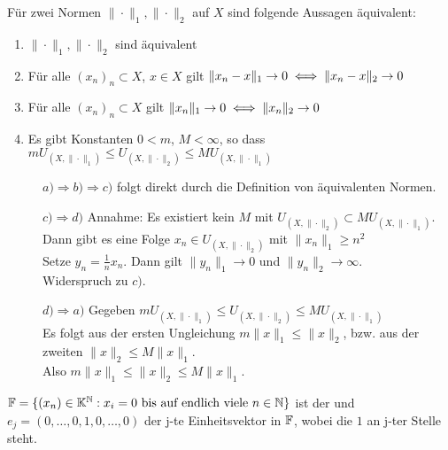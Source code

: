 \newpage %

\begin{prop} \label{prop:2.7}
	Für zwei Normen $\| \cdot \|_{1}, \| \cdot \|_{2}$ auf $X$ sind folgende Aussagen äquivalent:
	\begin{enumerate}[label=\alph*\upshape)]
		\item $\| \cdot \|_{1}, \| \cdot \|_{2}$ sind äquivalent
		\item Für alle $(x_{n})_{n} \subset X$, $x \in X$ gilt $\| x_{n} - x \|_{1} \rightarrow 0 \iff \| x_{n} - x \|_{2} \rightarrow 0 $
		\item Für alle $(x_{n})_{n} \subset X$ gilt $\| x_{n} \|_{1} \rightarrow 0 \iff \| x_{n} \|_{2} \rightarrow 0 $
		\item Es gibt Konstanten $0 < m$, $M < \infty$, so dass $m U_{(X, \| \cdot \|_{1})} \leq U_{(X, \| \cdot \|_{2})} \leq M U_{(X, \| \cdot \|_{1})}$
	\end{enumerate}
	\begin{beweis}
		\begin{description}
			\item[] $a) \Rightarrow b) \Rightarrow c)$ folgt direkt durch die Definition von äquivalenten Normen. 
  			\item[] $c) \Rightarrow d)$ Annahme: Es existiert kein $M$ mit $U_{(X, \| \cdot \|_{2})} \subset M U_{(X, \| \cdot \|_{1})}$. \\
  				Dann gibt es eine Folge $x_{n} \in U_{(X, \| \cdot \|_{2})}$ mit $\| x_{n} \|_{1} \geq n^{2}$ \\
  				Setze $y_{n} =  \frac{1}{n} x_{n}$. Dann gilt $\| y_{n} \|_{1} \rightarrow 0$ und $\| y_{n} \|_{2} \rightarrow \infty$. \\
  				Widerspruch zu $c)$.
  			 \item[] $d) \Rightarrow a)$ Gegeben $m U_{(X, \| \cdot \|_{1})} \leq U_{(X, \| \cdot \|_{2})} \leq M U_{(X, \| \cdot \|_{1})}$ \\
  			 Es folgt aus der ersten Ungleichung  $m \| x \|_{1} \leq \| x \|_{2}$, bzw. aus der zweiten $\| x \|_{2} \leq M \| x \|_{1}$. \\
  			 Also $m \| x \|_{1} \leq \| x \|_{2} \leq M \| x \|_{1}$. 
		\end{description}
	\end{beweis}
\end{prop}


\begin{vereinbarung}
	$\mathbb{F} = \{ (x_{n}) \in \mathbb{K}^{\mathbb{N}}: x_{i} = 0 \text{ bis auf endlich viele } n \in \mathbb{N} \} $ ist der  und $e_{j} = (0, \dotsc, 0, 1, 0, \dotsc, 0) $ der j-te Einheitsvektor in $\mathbb{F}$, wobei die $1$ an j-ter Stelle steht.
\end{vereinbarung}


